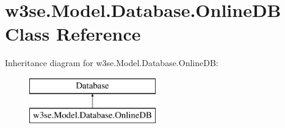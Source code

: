 \hypertarget{classw3se_1_1_model_1_1_database_1_1_online_d_b}{\section{w3se.\-Model.\-Database.\-Online\-D\-B Class Reference}
\label{classw3se_1_1_model_1_1_database_1_1_online_d_b}
}
Inheritance diagram for w3se.\-Model.\-Database.\-Online\-D\-B\-:\begin{figure}[H]
\begin{center}
\leavevmode
\includegraphics[height=2.000000cm]{classw3se_1_1_model_1_1_database_1_1_online_d_b}
\end{center}
\end{figure}
